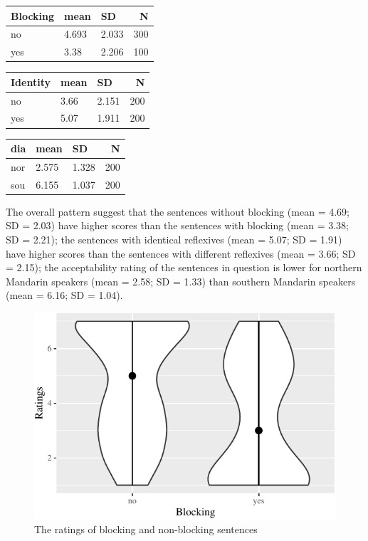 \documentclass[
  english,
  man,floatsintext]{apa6}
\begin{document}
\begin{table}

\centering
\begin{tabular}[t]{l|l|l|r}
\hline
Blocking & mean & SD & N\\
\hline
no & 4.693 & 2.033 & 300\\
\hline
yes & 3.38 & 2.206 & 100\\
\hline
\end{tabular}
\centering
\begin{tabular}[t]{l|l|l|r}
\hline
Identity & mean & SD & N\\
\hline
no & 3.66 & 2.151 & 200\\
\hline
yes & 5.07 & 1.911 & 200\\
\hline
\end{tabular}
\centering
\begin{tabular}[t]{l|l|l|r}
\hline
dia & mean & SD & N\\
\hline
nor & 2.575 & 1.328 & 200\\
\hline
sou & 6.155 & 1.037 & 200\\
\hline
\end{tabular}
\end{table}

The overall pattern suggest that the sentences without blocking (mean = 4.69; SD = 2.03) have higher scores than the sentences with blocking (mean = 3.38; SD = 2.21); the sentences with identical reflexives (mean = 5.07; SD = 1.91) have higher scores than the sentences with different reflexives (mean = 3.66; SD = 2.15); the acceptability rating of the sentences in question is lower for northern Mandarin speakers (mean = 2.58; SD = 1.33) than southern Mandarin speakers (mean = 6.16; SD = 1.04).

\begin{figure}

{\centering \includegraphics{manuscript_files/figure-latex/plot11-1} 

}

\caption{The ratings of blocking and non-blocking sentences}\label{fig:plot11}
\end{figure}
\end{document}
